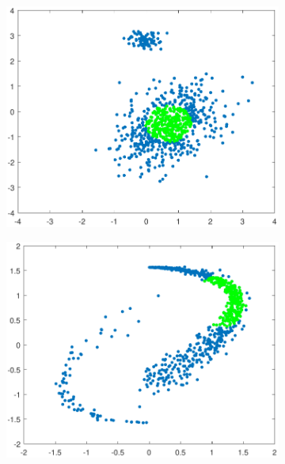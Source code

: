 \documentclass[preprint,12pt]{elsarticle}
\begin{document}
\begin{figure}[!htb]
		\begin{subfigure}[b]{0.40\linewidth}
			\centering\includegraphics[width=1\linewidth]{figures/kcstep/c1input.pdf}
			\caption{\label{fig:spatialmedc1}}
		\end{subfigure}
		\begin{subfigure}[b]{0.40\linewidth}
			\centering\includegraphics[width=1\linewidth]{figures/kcstep/c2input.pdf}
			\caption{\label{fig:spatialmedc2}}
		\end{subfigure} \\
		

\end{figure}
\end{document}
